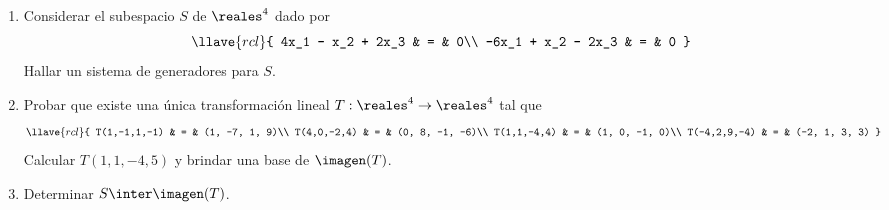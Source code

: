 \begin{enunciado}{\ejExtra}
  \begin{enumerate}[label=\alph*)]
    \item Considerar el subespacio $S$ de $\reales^4$ dado por
          $$
            \llave{rcl}{
              4x_1 - x_2 + 2x_3  & = & 0\\
              -6x_1 + x_2 - 2x_3 & = & 0
            }
          $$
          Hallar un sistema de generadores para $S$.

    \item Probar que existe una única transformación lineal $T: \reales^4 \to \reales^4$ tal que
          $$
            \llave{rcl}{
              T(1,-1,1,-1) & = & (1, -7, 1, 9)\\
              T(4,0,-2,4)  & = & (0, 8, -1, -6)\\
              T(1,1,-4,4)  & = & (1, 0, -1, 0)\\
              T(-4,2,9,-4) & = & (-2, 1, 3, 3)
            }
          $$
          Calcular $T(1,1, -4,5)$ y brindar una base de $\imagen(T)$.

    \item Determinar $S \inter \imagen(T)$.
  \end{enumerate}
\end{enunciado}

